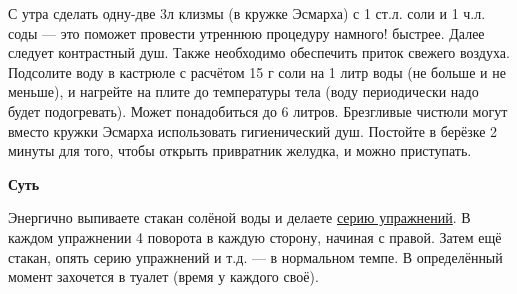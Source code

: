 С утра сделать одну-две 3л клизмы (в кружке Эсмарха) с 1 ст.л. соли и 1 ч.л. соды — это поможет провести утреннюю процедуру намного! быстрее. Далее следует контрастный душ. Также необходимо обеспечить приток свежего воздуха. Подсолите воду в кастрюле с расчётом 15 г соли на 1 литр воды (не больше и не меньше), и нагрейте на плите до температуры тела (воду периодически надо будет подогревать). Может понадобиться до 6 литров. Брезгливые чистюли могут вместо кружки Эсмарха использовать гигиенический душ.
Постойте в берёзке 2 минуты для того, чтобы открыть привратник желудка, и можно приступать.

\textbf{Суть}

Энергично выпиваете стакан солёной воды и делаете \href{http://youtu.be/-jrGWPXai2g}{серию упражнений}. В каждом упражнении 4 поворота в каждую сторону, начиная с правой. Затем ещё стакан, опять серию упражнений и т.д. — в нормальном темпе. В определённый момент захочется в туалет (время у каждого своё).


